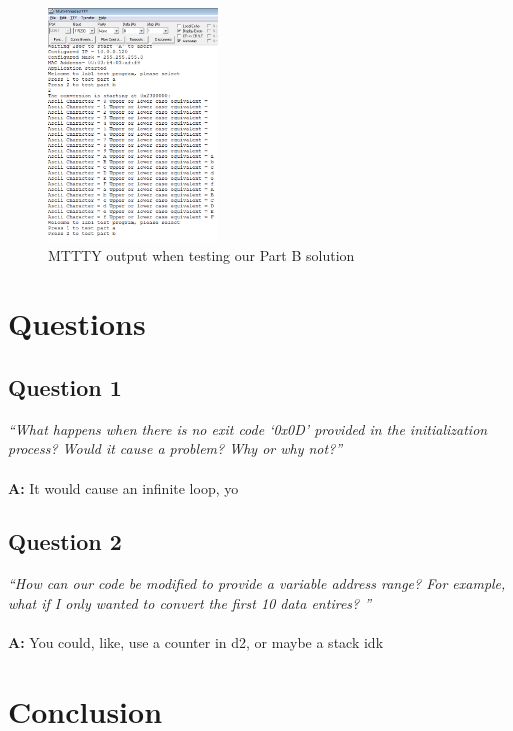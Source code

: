 \documentclass[letterpaper]{article}
\begin{document}
    \begin{figure}[h!]
      \centering
      \includegraphics[width=0.4\textwidth]{tst1b.png}
      \caption{MTTTY output when testing our Part B solution}
    \end{figure}

\section{Questions}

    \subsection{Question 1}
      \textit{``What happens when there is no exit code ‘0x0D’ provided in the initialization process? Would it cause a problem? Why or why not?''}
      \\ \\
      \noindent\textbf{A:}
      It would cause an infinite loop, yo

    \subsection{Question 2}
      \textit{``How can our code be modified to provide a variable address range? For example, what if I only wanted to convert the first 10 data entires? ''}
      \\ \\
      \noindent\textbf{A:}
      You could, like, use a counter in d2, or maybe a stack idk

\section{Conclusion}
  \lipsum[9]
  \medskip
  \lipsum[10]
\end{document}
